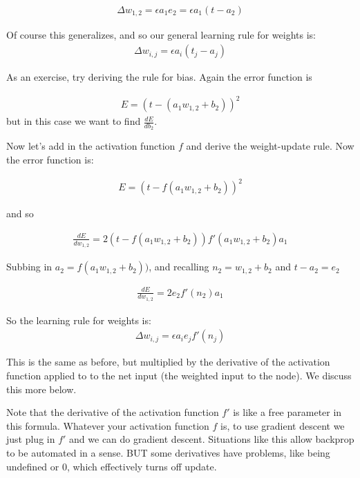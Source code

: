 \begin{eqnarray*}
\Delta w_{1,2}  =  \epsilon a_1 e_2  = \epsilon a_1 (t - a_2)
\end{eqnarray*} 

Of course this generalizes, and so our general learning rule for weights is:
\begin{eqnarray*}
\Delta w_{i,j}  =  \epsilon a_i (t_j - a_j)
\end{eqnarray*} 

As an exercise, try deriving the rule for bias.  Again the error function is

\begin{eqnarray*}
E =  (t - ( a_1 w_{1,2} + b_2))^2 
\end{eqnarray*}
but in this case we want to find $\frac{dE}{db_{2}}$.

Now let's add in the activation function $f$ and derive the weight-update rule. Now the error function is:

\begin{eqnarray*}
E =  (t - f(a_1w_{1,2} + b_2))^2   
\end{eqnarray*}

and so

\begin{eqnarray*}
\frac{dE}{dw_{1,2}} = 2 (t - f(a_1w_{1,2} + b_2)) f'(a_1w_{1,2} + b_2) a_1 
\end{eqnarray*}

Subbing in $a_2 = f(a_1w_{1,2} + b_2))$, and recalling $n_2 = w_{1,2} + b_2$  and $t - a_2 = e_2$ 

\begin{eqnarray*}
\frac{dE}{dw_{1,2}}  = 2 e_2 f'(n_2) a_1 
\end{eqnarray*}

So the learning rule for weights is:
\begin{eqnarray*}
\Delta w_{i,j}  =  \epsilon a_i e_j f'(n_j)
\end{eqnarray*} 

This is the same as before, but multiplied by the derivative of the activation function applied to to the net input (the weighted input to the node). We discuss this more below. 

Note that the derivative of the activation function $f'$ is like a free parameter in this formula. Whatever your activation function $f$ is, to use gradient descent we just plug in $f'$ and we can do gradient descent. Situations like this allow backprop to be automated in a sense. BUT some derivatives have problems, like being undefined or 0, which effectively turns off update.

